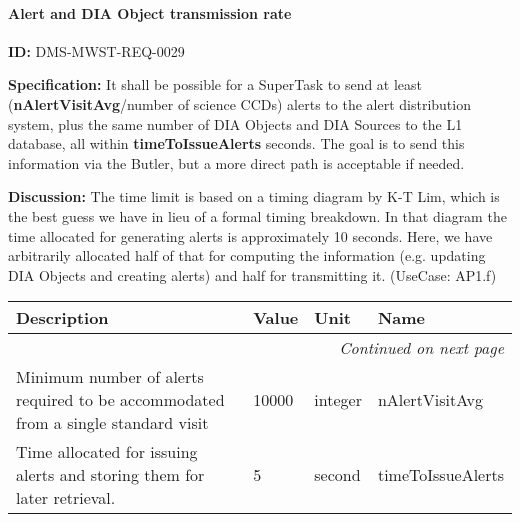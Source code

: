 \documentclass[SE,toc,lsstdraft]{lsstdoc}
\makeatletter
\newcommand{\paramname}[1]{\hspace{0pt}#1}
\newcommand{\unitname}[1]{\hspace{0pt}#1}
\newcommand{\addendum}{}
\newenvironment{parameters}[0]{%
\setlength\LTleft{0pt}
\setlength\LTright{\fill}
\begin{small}
\begin{longtable}[]{|p{0.49\textwidth}|l|p{0.6in}|p{1.70in}@{}|}

\hline \textbf{Description} & \textbf{Value} & \textbf{Unit} & \textbf{Name} \\ \hline
\endhead

\hline \multicolumn{4}{r}{\emph{Continued on next page}} \\
\endfoot

\hline\hline
\endlastfoot
}{%
\hline
\end{longtable}
\end{small}
}
\makeatother
\begin{document}
\paragraph{Alert and DIA Object transmission rate}\hfill  %

\label{DMS-MWST-REQ-0029}
\textbf{ID:} DMS-MWST-REQ-0029

\textbf{Specification:}
It shall be possible for a SuperTask to send at least (\textbf{nAlertVisitAvg}/number of science CCDs) alerts to the alert distribution system, plus the same number of DIA Objects and DIA Sources to the L1 database, all within \textbf{timeToIssueAlerts} seconds. The goal is to send this information via the Butler, but a more direct path is acceptable if needed.

\textbf{Discussion:}
The time limit is based on a timing diagram by K-T Lim, which is the best guess we have in lieu of a formal timing breakdown. In that diagram the time allocated for generating alerts is approximately 10 seconds. Here, we have arbitrarily allocated half of that for computing the information (e.g. updating DIA Objects and creating alerts) and half for transmitting it. (UseCase: AP1.f)

\begin{parameters}
Minimum number of alerts required to be accommodated from a single standard visit
&
10000
&
\unitname{%
integer
}
&
\paramname{%
nAlertVisitAvg
} \\\hline
Time allocated for issuing alerts and storing them for later retrieval.
&
5
&
\unitname{%
second
}
&
\paramname{%
timeToIssueAlerts
} \\\hline
\end{parameters}

\addendum


\end{document}
